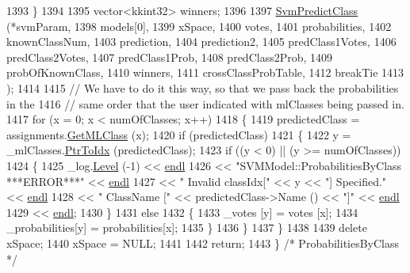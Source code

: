 \begin{DoxyCode}
1393   \}
1394 
1395   vector<kkint32>  winners;
1396 
1397   \hyperlink{namespace_k_k_m_l_l_a658f1d24f059e14b27229482d01e0400}{SvmPredictClass} (*svmParam,
1398                    models[0],
1399                    xSpace, 
1400                    votes,
1401                    probabilities, 
1402                    knownClassNum, 
1403                    prediction,
1404                    prediction2,
1405                    predClass1Votes,
1406                    predClass2Votes,
1407                    predClass1Prob,
1408                    predClass2Prob,
1409                    probOfKnownClass,
1410                    winners,
1411                    crossClassProbTable,
1412                    breakTie
1413                   );
1414 
1415   \textcolor{comment}{// We have  to do it this way, so that we pass back the probabilities in the }
1416   \textcolor{comment}{// same order that the user indicated with mlClasses being passed in.}
1417   \textcolor{keywordflow}{for}  (x = 0;  x < numOfClasses;  x++)
1418   \{
1419     predictedClass = assignments.\hyperlink{class_k_k_m_l_l_1_1_class_assignments_a1e6deee5eda8bf069953b65f6a0ef187}{GetMLClass} (x);
1420     \textcolor{keywordflow}{if}  (predictedClass)
1421     \{
1422       y = \_mlClasses.\hyperlink{class_k_k_b_1_1_k_k_queue_ac7c26abdf599669a4b0898534f735f99}{PtrToIdx} (predictedClass);
1423       \textcolor{keywordflow}{if}  ((y < 0)   ||   (y >= numOfClasses))
1424       \{
1425         \_log.\hyperlink{class_k_k_b_1_1_run_log_a32cf761d7f2e747465fd80533fdbb659}{Level} (-1) << \hyperlink{namespace_k_k_b_ad1f50f65af6adc8fa9e6f62d007818a8}{endl}
1426                 << \textcolor{stringliteral}{"SVMModel::ProbabilitiesByClass   ***ERROR***"}                                          
                 << \hyperlink{namespace_k_k_b_ad1f50f65af6adc8fa9e6f62d007818a8}{endl}
1427                 << \textcolor{stringliteral}{"                                 Invalid classIdx["} << y                       << \textcolor{stringliteral}{"] 
       Specified."} << \hyperlink{namespace_k_k_b_ad1f50f65af6adc8fa9e6f62d007818a8}{endl}
1428                 << \textcolor{stringliteral}{"                                 ClassName       ["} << predictedClass->Name () << \textcolor{stringliteral}{"]"}  
                 << \hyperlink{namespace_k_k_b_ad1f50f65af6adc8fa9e6f62d007818a8}{endl}
1429                 << \hyperlink{namespace_k_k_b_ad1f50f65af6adc8fa9e6f62d007818a8}{endl};
1430       \}
1431       \textcolor{keywordflow}{else}
1432       \{
1433         \_votes        [y] = votes        [x];
1434         \_probabilities[y] = probabilities[x];
1435       \}
1436     \}
1437   \}
1438 
1439   \textcolor{keyword}{delete}  xSpace;  
1440   xSpace = NULL;
1441 
1442   \textcolor{keywordflow}{return};
1443 \}  \textcolor{comment}{/* ProbabilitiesByClass */}
\end{DoxyCode}
